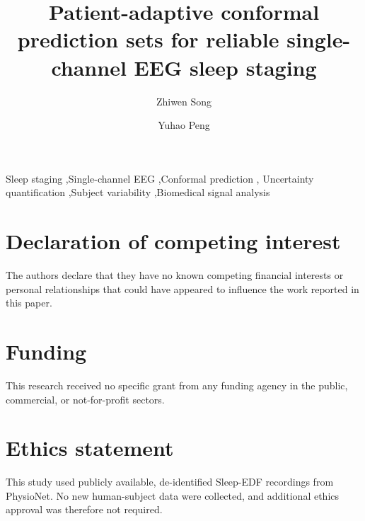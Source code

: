 \documentclass[preprint,12pt]{elsarticle}
\theoremstyle{definition}
\theoremstyle{remark}
\begin{document}
\begin{frontmatter}

\title{Patient-adaptive conformal prediction sets for reliable single-channel
EEG sleep staging}

\ifdefined\ANONYMOUS
\else
\author[aff1]{Zhiwen Song}
\author[aff1]{Yuhao Peng}
\fi

\begin{abstract}

\end{abstract}

\begin{keyword}
Sleep staging \sep Single-channel EEG \sep Conformal prediction \sep
Uncertainty quantification \sep Subject variability \sep Biomedical signal
analysis
\end{keyword}

\end{frontmatter}

\ifdefined\REVIEWCOPY
\doublespacing
\linenumbers
\fi









\section*{Declaration of competing interest}
The authors declare that they have no known competing financial interests or
personal relationships that could have appeared to influence the work
reported in this paper.

\section*{Funding}
This research received no specific grant from any funding agency in the public,
commercial, or not-for-profit sectors.

\section*{Ethics statement}
This study used publicly available, de-identified Sleep-EDF recordings from
PhysioNet. No new human-subject data were collected, and additional ethics
approval was therefore not required.
\end{document}
